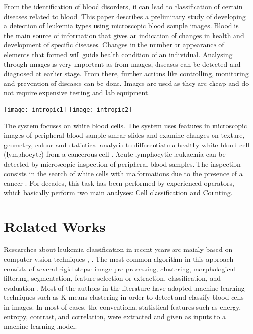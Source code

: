 \documentclass[review]{elsarticle}
\begin{document}
From the identification of blood disorders, it can lead to classification of certain diseases related to blood. This paper describes a preliminary study of developing a detection of leukemia types using microscopic blood sample images. \citep{Intro7} Blood is the main source of information that gives an indication of changes in health and development of specific diseases. Changes in the number or appearance of elements that formed will guide health condition of an individual. Analysing through images is very important as from images, diseases can be detected and diagnosed at earlier stage. From there, further actions like controlling, monitoring and prevention of diseases can be done. Images are used as they are cheap and do not require expensive testing and lab equipment.
\bigbreak
\begin{center}
\texttt{[image: intropic1]}
\texttt{[image: intropic2]}
\end{center}
\bigbreak
The system focuses on white blood cells. The system uses features in microscopic images of peripheral blood sample smear slides and examine changes on texture, geometry, colour and statistical analysis to differentiate a healthy white blood cell (lymphocyte) from a cancerous cell \citep{Intro8}. Acute lymphocytic leukaemia can be detected by microscopic inspection of peripheral blood samples. The inspection consists in the search of white cells with malformations due to the presence of a cancer \citep{Intro9}. For decades, this task has been performed by experienced operators, which basically perform two main analyses: Cell classification and Counting.

\section*{Related Works}
Researches about leukemia classification in recent years are mainly based on computer vision techniques \citep{Related1}, \citep{Related2}. The most common algorithm in this approach consists of several rigid steps: image pre-processing, clustering, morphological filtering, segmentation, feature selection or extraction, classification, and evaluation \citep{Related3}. Most of the authors in the literature have adopted machine learning techniques such as K-means clustering in order to detect and classify blood cells in images. In most of cases, the conventional statistical features such as energy, entropy, contrast, and correlation, were extracted and given as inputs to a machine learning model.  
\end{document}
